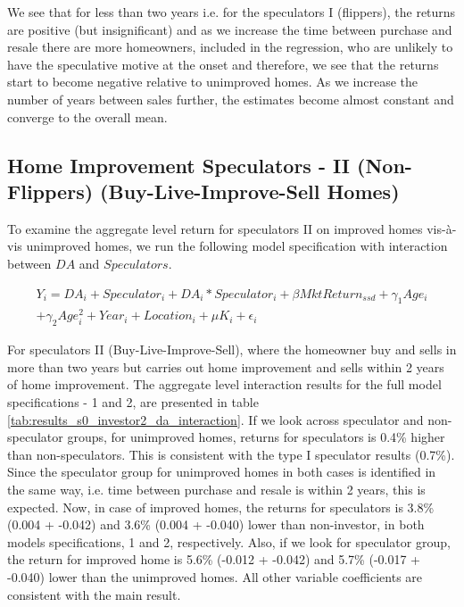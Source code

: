 \documentclass[AEJ,reqno, draftmode]{AEA} %
\begin{document}
We see that for less than two years i.e. for the speculators I (flippers), the returns are positive (but insignificant) and as we increase the time between purchase and resale there are more homeowners, included in the regression, who are unlikely to have the speculative motive at the onset and therefore, we see that the returns start to become negative relative to unimproved homes. As we increase the number of years between sales further, the estimates become almost constant and converge to the overall mean. 


\subsection{Home Improvement Speculators - II (Non-Flippers) (Buy-Live-Improve-Sell Homes)}

To examine the aggregate level return for speculators II on improved homes vis-à-vis unimproved homes, we run the following model specification with interaction between $DA$ and $Speculators$. 

\begin{equation} \label{eq: spec II}
\begin{aligned}
    Y_i = DA_i + Speculator_i + DA_i * Speculator_i + \beta{MktReturn_{ssd}} + \gamma_1{Age_i}\\ + \gamma_2{Age_i^2} + Year_i + Location_i + \mu{K_i} + \epsilon_i
\end{aligned}
\end{equation}

For speculators II (Buy-Live-Improve-Sell), where the homeowner buy and sells in more than two years but carries out home improvement and sells within 2 years of home improvement. The aggregate level interaction results for the full model specifications - 1 and 2, are presented in table \ref{tab:results_s0_investor2_da_interaction}. 
If we look across speculator and non-speculator groups, for unimproved homes, returns for speculators is 0.4\% higher than non-speculators. This is consistent with the type I speculator results (0.7\%). Since the speculator group for unimproved homes in both cases is identified in the same way, i.e. time between purchase and resale is within 2 years, this is expected. Now, in case of improved homes, the returns for speculators is 3.8\% (0.004 + -0.042) and 3.6\% (0.004 + -0.040) lower than non-investor, in both models specifications, 1 and 2, respectively. Also, if we look for speculator group, the return for improved home is 5.6\% (-0.012 + -0.042) and 5.7\% (-0.017 + -0.040) lower than the unimproved homes. All other variable coefficients are consistent with the main result. 
\end{document}
